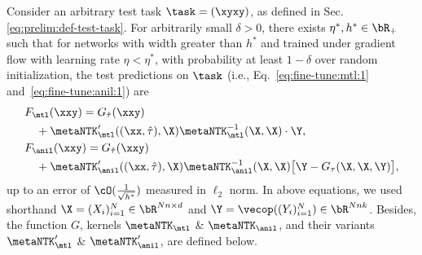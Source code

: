 \documentclass{article}
\begin{document}
\begin{lemma} \label{lemma:test-predict}
Consider an arbitrary test task $\task = (\xyxy)$, as defined in Sec. \ref{eq:prelim:def-test-task}. For arbitrarily small $\delta>0$, there exists $\eta^*,h^*\in \bR_+$ such that for networks with width greater than $h^*$ and trained under gradient flow with learning rate $\eta < \eta^*$, with probability at least $1-\delta$ over random initialization, the test predictions on $\task$ (i.e., Eq.~\eqref{eq:fine-tune:mtl:1} and~\eqref{eq:fine-tune:anil:1}) are 
\begin{align}
    &F_\mtl(\xxy) = G_{\hat\tau}(\xxy) \label{eq:lemma:test-pred:F_mtl}\\
     &\quad+\metaNTK_\mtl'((\xx,\hat\tau),\X) \metaNTK_\mtl^{-1}(\X,\X)\cdot \Y,\nonumber\\
     &F_\anil(\xxy) = G_{\hat\tau}(\xxy) \label{eq:lemma:test-pred:F_anil}\\
     &\quad+\metaNTK_\anil'((\xx,\hat\tau),\X) \metaNTK_\anil^{-1}(\X,\X)\big[\Y-G_\tau(\X,\X,\Y)\big],\nonumber
\end{align}
up to an error of $\cO(\frac{1}{\sqrt{h^*}})$ measured in $\ell_2$ norm. In above equations, we used shorthand $\X = (X_i)_{i=1}^N\in \bR^{Nn\times d}$ and $\Y=\vecop((Y_i)_{i=1}^N) \in \bR^{Nnk}$. Besides, the function $G$, kernels $\metaNTK_\mtl$ \& $\metaNTK_\anil$, and their variants $\metaNTK_\mtl'$ \& $\metaNTK_\anil'$, are defined below. 
    

\end{lemma}
\end{document}

